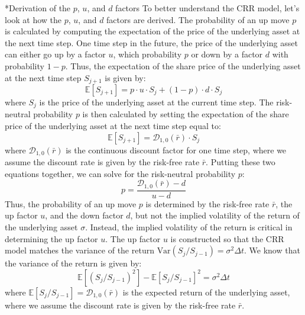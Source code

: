 \documentclass[11pt]{article}
\makeatletter
\theoremstyle{definition}
\renewcommand\subsubsection{\@startsection
	{subsubsection}{2}{0mm}
	{-0.05in}
	{-0.5\baselineskip}
	{\normalfont\normalsize\itshape\bfseries}}
\makeatother
\begin{document}
\subsubsection*{Derivation of the $p$, $u$, and $d$ factors}
To better understand the CRR model, let's look at how the $p$, $u$, and $d$ factors are derived. The probability
of an up move $p$ is calculated by computing the expectation of the price of the underlying asset at the next time step.
One time step in the future, the price of the underlying asset can either go up by a factor $u$, which probability $p$ or down by a factor $d$
with probability $1-p$. Thus, the expectation of the share price of the underlying asset at the next time step $S_{j+1}$ is given by:
\begin{equation*}
	\mathbb{E}[S_{j+1}] = p\cdot{u}\cdot{S}_{j} + (1-p)\cdot{d}\cdot{S_{j}}
\end{equation*}
where $S_{j}$ is the price of the underlying asset at the current time step. 
The risk-neutral probability $p$ is then calculated by setting the expectation of the share price of the underlying asset at the next time step equal to: 
\begin{equation*}
	\mathbb{E}[S_{j+1}] = \mathcal{D}_{1,0}(\bar{r})\cdot{S}_{j}
\end{equation*}
where $\mathcal{D}_{1,0}(\bar{r})$ is the continuous discount factor for one time step, where we assume the discount rate is given by the risk-free rate $\bar{r}$.
Putting these two equations together, we can solve for the risk-neutral probability $p$:
\begin{equation*}
	p = \frac{\mathcal{D}_{1,0}(\bar{r}) - d}{u - d}
\end{equation*}
Thus, the probability of an up move $p$ is determined by the risk-free rate $\bar{r}$, the up factor $u$, and the down factor $d$, 
but not the implied volatility of the return of the underlying asset $\sigma$.  
Instead, the implied volatility of the return is critical in determining the up factor $u$.
The up factor $u$ is constructed so that the CRR model matches the variance of the return $\text{Var}(S_{j}/S_{j-1})=\sigma^{2}\Delta{t}$.
We know that the variance of the return is given by:
\begin{equation}
\mathbb{E}\left[(S_{j}/S_{j-1})^2\right] - \mathbb{E}\left[S_{j}/S_{j-1}\right]^{2} = \sigma^{2}\Delta{t}
\end{equation}
where $\mathbb{E}\left[S_{j}/S_{j-1}\right] = \mathcal{D}_{1,0}(\bar{r})$ is the expected return of the underlying asset, 
where we assume the discount rate is given by the risk-free rate $\bar{r}$.
\end{document}
